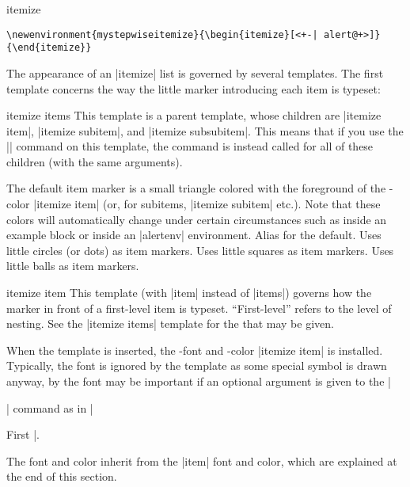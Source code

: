 \begin{environment}{{itemize}}
  \example
\begin{verbatim}
\newenvironment{mystepwiseitemize}{\begin{itemize}[<+-| alert@+>]}{\end{itemize}}
\end{verbatim}

  The appearance of an |itemize| list is governed by several templates. The first template concerns the way the little marker introducing each item is typeset:
  \begin{element}{itemize items}\semiyes\no\no
    This template is a parent template, whose children are |itemize item|, |itemize subitem|, and |itemize subsubitem|. This means that if you use the |\setbeamertemplate| command on this template, the command is instead called for all of these children (with the same arguments).

    \begin{templateoptions}
      The default item marker is a small triangle colored with the foreground of the \beamer-color |itemize item| (or, for subitems, |itemize subitem| etc.). Note that these colors will automatically change under certain circumstances such as inside an example block or inside an |alertenv| environment.
      Alias for the default.
      Uses little circles (or dots) as item markers.
      Uses little squares as item markers.
      Uses little balls as item markers.
    \end{templateoptions}
  \end{element}

  \begin{element}{itemize item}\yes\yes\yes
    This template (with |item| instead of |items|) governs how the marker in front of a first-level item is typeset. ``First-level'' refers to the level of nesting. See the |itemize items| template for the  that may be given.

    When the template is inserted, the \beamer-font and -color |itemize item| is installed. Typically, the font is ignored by the template as some special symbol is drawn anyway, by the font may be important if an optional argument is given to the |\item| command as in |\item[First]|.

    The font and color inherit from the |item| font and color, which are explained at the end of this section.
  \end{element}


\end{environment}
